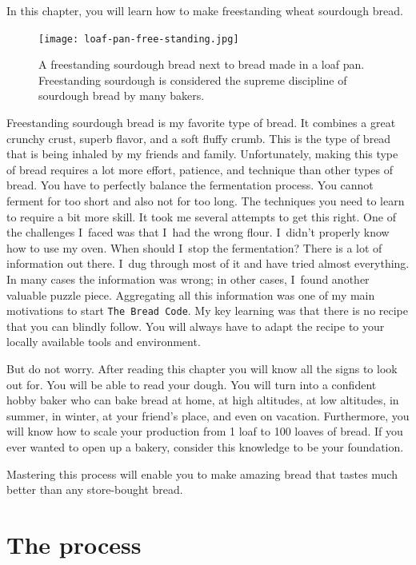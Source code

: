 \begin{quoting}
In this chapter, you will learn how to make
freestanding wheat sourdough bread.
\end{quoting}

\begin{figure}[!htb]
  \texttt{[image: loaf-pan-free-standing.jpg]}
  \caption[Freestanding and loaf pan bread]{A freestanding sourdough bread
      next to bread made in a loaf pan.  Freestanding sourdough is considered
      the supreme discipline of sourdough bread by many bakers.}
\end{figure}

Freestanding sourdough bread is my favorite
type of bread. It combines a great crunchy crust, superb
flavor, and a soft fluffy crumb. This is the type of bread
that is being inhaled by my friends and family. Unfortunately,
making this type of bread requires a lot more effort, patience,
and technique than other types of bread. You have to perfectly
balance the fermentation process. You cannot ferment for too
short and also not for too long. The techniques you need to
learn to require a bit more skill. It took me several attempts
to get this right. One of the challenges I~faced was that
I~had the wrong flour. I~didn't properly know how to use my oven.
When should I~stop the fermentation? There is a lot of information
out there. I~dug through most of it and have tried almost everything.
In many cases the information was wrong; in other cases, I~found another
valuable puzzle piece. Aggregating all this
information was one of my main motivations to start \texttt{The Bread Code}.
My key learning was that there is no recipe that
you can blindly follow. You will always have to adapt the recipe
to your locally available tools and environment.

But do not worry. After reading this chapter you will know
all the signs to look out for. You will be able to read your dough.
You will turn into a confident hobby baker who can bake bread
at home, at high altitudes, at low altitudes, in summer, in winter,
at your friend's place, and even on vacation. Furthermore,
you will know how to scale your production from 1 loaf to 100 loaves of bread.
If you ever wanted to open up a bakery, consider this knowledge to
be your foundation.

Mastering this process will enable you to make amazing bread
that tastes much better than any store-bought bread.

\section{The process}

